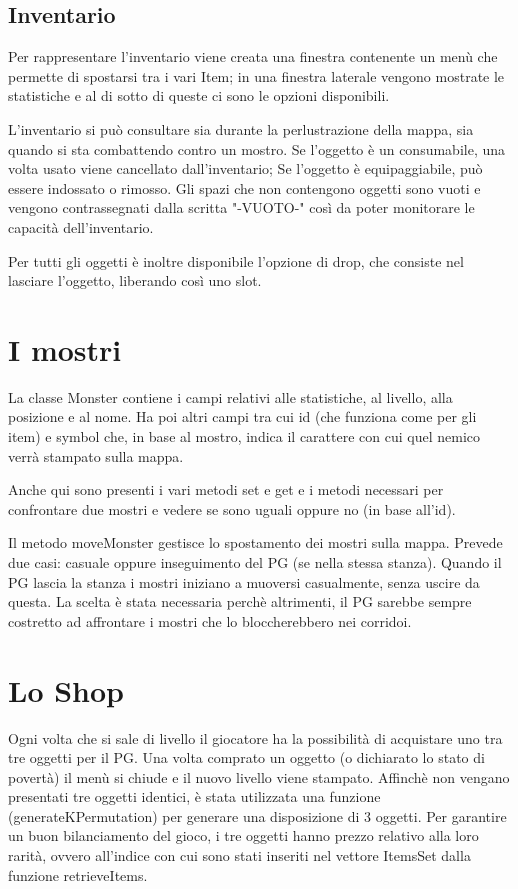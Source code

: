 \documentclass[10pt]{report}
\begin{document}
\subsection{Inventario}
Per rappresentare l'inventario viene creata una finestra contenente un menù che permette di spostarsi tra i vari Item; in una finestra laterale vengono mostrate le statistiche e al di sotto di queste ci sono le opzioni disponibili.

L'inventario si può consultare sia durante la perlustrazione della mappa, sia quando 
si sta combattendo contro un mostro. 
Se l'oggetto è un consumabile, una volta usato viene cancellato dall'inventario; 
Se l'oggetto è equipaggiabile, può essere indossato o rimosso. Gli spazi che non contengono oggetti sono vuoti e vengono contrassegnati dalla scritta "-VUOTO-" così da poter monitorare le capacità dell'inventario. 

Per tutti gli oggetti è inoltre disponibile l'opzione di drop, che consiste nel lasciare l'oggetto, liberando così uno slot.

\section{I mostri}

La classe Monster contiene i campi relativi alle statistiche, al livello, alla posizione e al nome.
Ha poi altri campi tra cui id (che funziona come per gli item) e symbol che, in base al mostro, indica
il carattere con cui quel nemico verrà stampato sulla mappa.

Anche qui sono presenti i vari metodi set e get e i metodi necessari per confrontare due mostri e vedere
se sono uguali oppure no (in base all'id).

Il metodo moveMonster gestisce lo spostamento dei mostri sulla mappa. Prevede due casi: 
casuale oppure inseguimento del PG (se nella stessa stanza). Quando il PG lascia la stanza i mostri iniziano a muoversi casualmente, senza uscire da questa. La scelta è stata necessaria perchè altrimenti, 
il PG sarebbe sempre costretto ad affrontare i mostri che lo bloccherebbero nei corridoi.	

\section{Lo Shop}

Ogni volta che si sale di livello il giocatore ha la possibilità di acquistare uno tra tre oggetti per 
il PG. Una volta comprato un oggetto (o dichiarato lo stato di povertà) il menù si chiude e il nuovo livello viene stampato. Affinchè non vengano presentati tre oggetti identici, è stata utilizzata una funzione (generateKPermutation) per generare una disposizione di 3 oggetti. Per garantire un buon bilanciamento del gioco, i tre oggetti hanno prezzo relativo alla loro rarità, ovvero all'indice con cui sono stati inseriti nel vettore ItemsSet dalla funzione retrieveItems.
\end{document}
